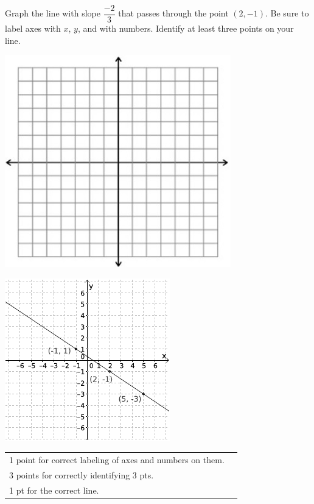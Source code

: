 

{
	Graph the line with slope $\dfrac{-2}{3}$ that passes through the point $(2, -1)$. Be sure to label axes with $x$, $y$, and with numbers. Identify at least three points on your line.\begin{onlyproblem}\begin{center}\includegraphics{fig-graphpaper.png}\end{center}\end{onlyproblem} \begin{onlysolution}\begin{center}\includegraphics{fig095-08-b-answer}\end{center}\end{onlysolution}
}
{
	\begin{tabular}{l r}
	1 point for correct labeling of axes and numbers on them.\\
	3 points for correctly identifying 3 pts.\\
	1 pt for the correct line.\\
	\end{tabular}
}
